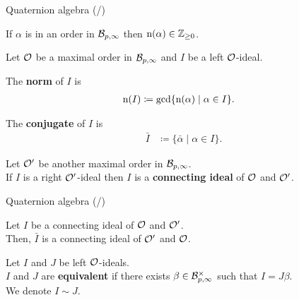 \begin{frame}{Quaternion algebra (/\quatotal{})}
    \begin{lemma}
        If $\alpha$ is in an order in $\mathcal{B}_{p,\infty}$ then $\mathrm{n}(\alpha) \in \mathbb{Z}_{\geq 0}$.
    \end{lemma}

    \vspace{10pt}
    Let $\mathcal{O}$ be a maximal order in $\mathcal{B}_{p,\infty}$
    and $I$ be a left $\mathcal{O}$-ideal.

    The \textbf{norm} of $I$ is
    \begin{align*}
        \mathrm{n}(I) &\coloneqq \gcd\{\mathrm{n}(\alpha) \mid \alpha \in I\}.
    \end{align*}

    The \textbf{conjugate} of $I$ is
    \begin{align*}
        \bar{I} &\coloneqq \{\bar{\alpha} \mid \alpha \in I\}.
    \end{align*}

    Let $\mathcal{O}'$ be another maximal order in $\mathcal{B}_{p,\infty}$.\\
    If $I$ is a right $\mathcal{O}'$-ideal then $I$ is a \textbf{connecting ideal} of $\mathcal{O}$ and $\mathcal{O}'$.
\end{frame}

\begin{frame}{Quaternion algebra (/\quatotal{})}
    \begin{lemma}
        Let $I$ be a connecting ideal of $\mathcal{O}$ and $\mathcal{O}'$.\\
        Then, $\bar{I}$ is a connecting ideal of $\mathcal{O}'$ and $\mathcal{O}$.
    \end{lemma}

    \vspace{10pt}
    \begin{definition}
        Let $I$ and $J$ be left $\mathcal{O}$-ideals.\\
        $I$ and $J$ are \textbf{equivalent}
        if there exists $\beta \in \mathcal{B}_{p,\infty}^{\times}$ such that $I = J\beta$.\\
        We denote $I \sim J$.
    \end{definition}
\end{frame}

